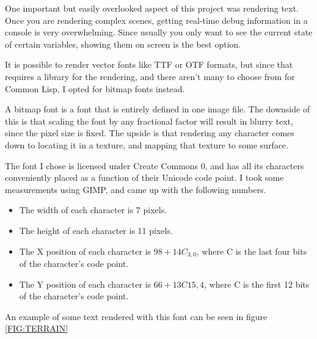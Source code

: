 
One important but easily overlooked aspect of this project was rendering text.
Once you are rendering complex scenes,
getting real-time debug information in a console is very overwhelming.
Since usually you only want to see the current state of certain variables,
showing them on screen is the best option.

It is possible to render vector fonts like TTF or OTF formats,
but since that requires a library for the rendering,
and there aren't many to choose from for Common Lisp,
I opted for bitmap fonts instead.

A bitmap font is a font that is entirely defined in one image file.
The downside of this is that scaling the font by any fractional factor will result in blurry text,
since the pixel size is fixed.
The upside is that rendering any character comes down to locating it in a texture,
and mapping that texture to some surface.

The font I chose is licensed under Create Commons 0,
and has all its characters conveniently placed as a function of their Unicode code point.
I took some measurements using GIMP,
and came up with the following numbers.

\begin{itemize}
\item The width of each character is 7 pixels.
\item The height of each character is 11 pixels.
\item The X position of each character is $98 + 14C_{3,0}$, where C is the last four bits of the character's code point.
\item The Y position of each character is $66 + 13C{15,4}$, where C is the first 12 bits of the character's code point.
\end{itemize}

An example of some text rendered with this font can be seen in figure \ref{FIG:TERRAIN}
